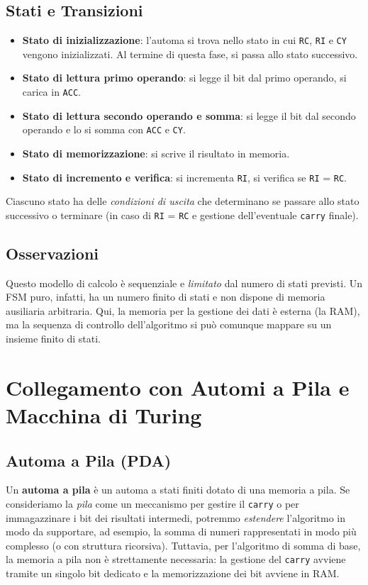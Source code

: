 \documentclass[a4paper,12pt]{report}
\begin{document}
\subsection{Stati e Transizioni}
\begin{itemize}
    \item \textbf{Stato di inizializzazione}: l'automa si trova nello stato in cui \texttt{RC}, \texttt{RI} e \texttt{CY} vengono inizializzati. Al termine di questa fase, si passa allo stato successivo.
    \item \textbf{Stato di lettura primo operando}: si legge il bit dal primo operando, si carica in \texttt{ACC}.
    \item \textbf{Stato di lettura secondo operando e somma}: si legge il bit dal secondo operando e lo si somma con \texttt{ACC} e \texttt{CY}.
    \item \textbf{Stato di memorizzazione}: si scrive il risultato in memoria.
    \item \textbf{Stato di incremento e verifica}: si incrementa \texttt{RI}, si verifica se \texttt{RI} = \texttt{RC}.
\end{itemize}

Ciascuno stato ha delle \textit{condizioni di uscita} che determinano se passare allo stato successivo o terminare (in caso di \texttt{RI} = \texttt{RC} e gestione dell'eventuale \texttt{carry} finale).

\subsection{Osservazioni}
Questo modello di calcolo è sequenziale e \textit{limitato} dal numero di stati previsti. Un FSM puro, infatti, ha un numero finito di stati e non dispone di memoria ausiliaria arbitraria. Qui, la memoria per la gestione dei dati è esterna (la RAM), ma la sequenza di controllo dell'algoritmo si può comunque mappare su un insieme finito di stati.

\section{Collegamento con Automi a Pila e Macchina di Turing}
\subsection{Automa a Pila (PDA)}
Un \textbf{automa a pila} è un automa a stati finiti dotato di una memoria a pila. Se consideriamo la \textit{pila} come un meccanismo per gestire il \texttt{carry} o per immagazzinare i bit dei risultati intermedi, potremmo \emph{estendere} l'algoritmo in modo da supportare, ad esempio, la somma di numeri rappresentati in modo più complesso (o con struttura ricorsiva). Tuttavia, per l'algoritmo di somma di base, la memoria a pila non è strettamente necessaria: la gestione del \texttt{carry} avviene tramite un singolo bit dedicato e la memorizzazione dei bit avviene in RAM.
\end{document}
